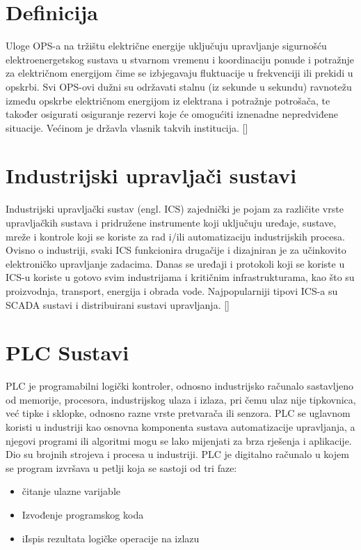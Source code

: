 \documentclass[times, utf8, zavrsni]{fer}
\begin{document}
\section{Definicija}
Uloge OPS-a na tržištu električne energije uključuju upravljanje sigurnošću elektroenergetskog sustava u stvarnom vremenu i koordinaciju ponude i potražnje za električnom energijom čime se izbjegavaju fluktuacije u frekvenciji ili prekidi u opskrbi. 
Svi OPS-ovi dužni su održavati stalnu (iz sekunde u sekundu) ravnotežu između opskrbe električnom energijom iz elektrana i potražnje potrošača, te također osigurati osiguranje rezervi koje će omogućiti iznenadne nepredviđene situacije. Većinom je državla vlasnik takvih institucija. [\cite{tso}]

\section{Industrijski upravljači sustavi}
Industrijski upravljački sustav (engl. ICS) zajednički je pojam za različite vrste upravljačkih sustava i pridružene instrumente koji uključuju uređaje, sustave, mreže i kontrole koji se koriste za rad i/ili automatizaciju industrijskih procesa. Ovisno o industriji, svaki ICS funkcionira drugačije i dizajniran je za učinkovito elektroničko upravljanje zadacima. Danas se uređaji i protokoli koji se koriste u ICS-u koriste u gotovo svim industrijama i kritičnim infrastrukturama, kao što su proizvodnja, transport, energija i obrada vode. Najpopularniji tipovi ICS-a su SCADA sustavi i distribuirani sustavi upravljanja. [\cite{ics-def}]

\section{PLC Sustavi}

PLC je programabilni logički kontroler, odnosno industrijsko računalo sastavljeno od memorije, procesora, industrijskog ulaza i izlaza, pri čemu ulaz nije tipkovnica, već tipke i sklopke, odnosno razne vrste pretvarača ili senzora. PLC se uglavnom koristi u industriji kao osnovna komponenta sustava automatizacije upravljanja, a njegovi programi ili algoritmi mogu se lako mijenjati za brza rješenja i aplikacije. Dio su brojnih strojeva i procesa u industriji.
 PLC je digitalno računalo u kojem se program izvršava u petlji koja se sastoji od tri faze:
\begin{itemize}
\item{čitanje ulazne varijable}
\item{Izvođenje programskog koda}
\item{iIspis rezultata logičke operacije na izlazu}
\end{itemize}
\end{document}
